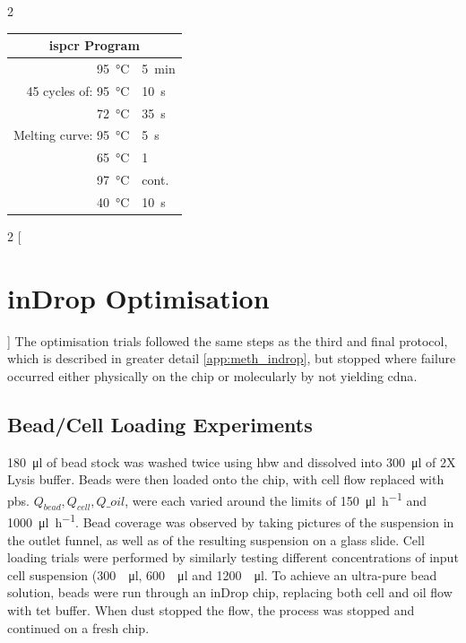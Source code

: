 \begin{appendix}
\begin{multicols}{2}
\begin{center}
\begin{tabular}{r|l}
	\multicolumn{2}{c}{\acrshort{ispcr} Program} \\
	\hline
	\SI{95}{\celsius} & \SI{5}{\minute} \\
	\hline
	45 cycles of: \SI{95}{\celsius} & \SI{10}{\second} \\
	\SI{72}{\celsius} & \SI{35}{\second} \\
	\hline
	Melting curve: \SI{95}{\celsius} & \SI{5}{\second} \\
	\SI{65}{\celsius} & \SI{1}{\min} \\
	\SI{97}{\celsius} & cont. \\
	\hline
	\SI{40}{\celsius} & \SI{10}{\second} \\
\end{tabular}
\end{center}
\medskip

\end{multicols}

\newpage
\begin{multicols}{2}
[\section{inDrop Optimisation}\label{app:meth_indrop_opt}]
The optimisation trials followed the same steps as the third and final protocol, which is described in greater detail \ref{app:meth_indrop}, but stopped where failure occurred either physically on the chip or molecularly by not yielding \acrshort{cdna}.

\subsection{Bead/Cell Loading Experiments}
\SI{180}{\ul} of bead stock was washed twice using \acrshort{hbw} and dissolved into \SI{300}{\ul} of 2X Lysis buffer. Beads were then loaded onto the chip, with cell flow replaced with \acrshort{pbs}. $Q_{bead}, Q_{cell}, Q\_{oil}$, were each varied around the limits of \SI[per-mode=symbol]{150}{\ul\per\hour} and \SI[per-mode=symbol]{1000}{\ul\per\hour}. Bead coverage was observed by taking pictures of the suspension in the outlet funnel, as well as of the resulting suspension on a glass slide. Cell loading trials were performed by similarly testing different concentrations of input cell suspension (\SI[per-mode=symbol]{300}{\per\ul}, \SI[per-mode=symbol]{600}{\per\ul} and \SI[per-mode=symbol]{1200}{\per\ul}. To achieve an ultra-pure bead solution, beads were run through an inDrop chip, replacing both cell and oil flow with \acrshort{tet} buffer. When dust stopped the flow, the process was stopped and continued on a fresh chip.\pms


\end{multicols}
\end{appendix}
